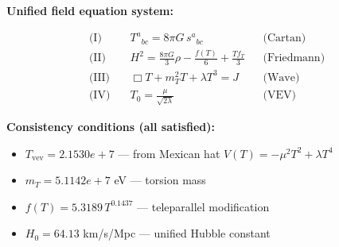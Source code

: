 
\textbf{Unified field equation system:}

\begin{align}
  \text{(I)} \quad & T^a{}_{bc} = 8\pi G \, s^a{}_{bc} && \text{(Cartan)} \\
  \text{(II)} \quad & H^2 = \frac{8\pi G}{3}\rho - \frac{f(T)}{6} + \frac{Tf_T}{3} && \text{(Friedmann)} \\
  \text{(III)} \quad & \Box T + m_T^2 T + \lambda T^3 = J && \text{(Wave)} \\
  \text{(IV)} \quad & T_0 = \frac{\mu}{\sqrt{2\lambda}} && \text{(VEV)}
\end{align}

\textbf{Consistency conditions (all satisfied):}
\begin{itemize}
  \item $T_{\text{vev}} = 2.1530e+7$ — from Mexican hat $V(T) = -\mu^2 T^2 + \lambda T^4$
  \item $m_T = 5.1142e+7$ eV — torsion mass
  \item $f(T) = 5.3189 \, T^{0.1437}$ — teleparallel modification
  \item $H_0 = 64.13$ km/s/Mpc — unified Hubble constant
\end{itemize}